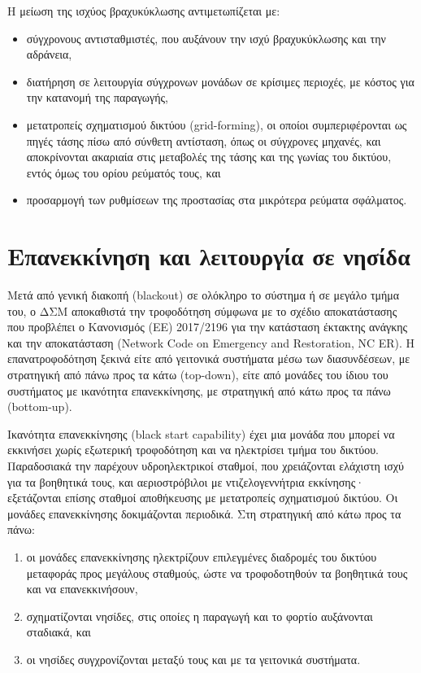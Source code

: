 Η μείωση της ισχύος βραχυκύκλωσης αντιμετωπίζεται με:

\begin{itemize}
\item σύγχρονους αντισταθμιστές, που αυξάνουν την ισχύ βραχυκύκλωσης και την αδράνεια,
\item διατήρηση σε λειτουργία σύγχρονων μονάδων σε κρίσιμες περιοχές, με κόστος για την
      κατανομή της παραγωγής,
\item μετατροπείς σχηματισμού δικτύου (grid-forming), οι οποίοι συμπεριφέρονται ως πηγές τάσης
      πίσω από σύνθετη αντίσταση, όπως οι σύγχρονες μηχανές, και αποκρίνονται ακαριαία στις
      μεταβολές της τάσης και της γωνίας του δικτύου, εντός όμως του ορίου ρεύματός τους, και
\item προσαρμογή των ρυθμίσεων της προστασίας στα μικρότερα ρεύματα σφάλματος.
\end{itemize}

\section{Επανεκκίνηση και λειτουργία σε νησίδα}
\label{sec:restoration}

Μετά από γενική διακοπή (blackout) σε ολόκληρο το σύστημα ή σε μεγάλο τμήμα του, ο ΔΣΜ
αποκαθιστά την τροφοδότηση σύμφωνα με το σχέδιο αποκατάστασης που προβλέπει ο Κανονισμός (ΕΕ)
2017/2196 για την κατάσταση έκτακτης ανάγκης και την αποκατάσταση (Network Code on Emergency and
Restoration, NC ER). Η επανατροφοδότηση ξεκινά είτε από γειτονικά συστήματα μέσω των
διασυνδέσεων, με στρατηγική από πάνω προς τα κάτω (top-down), είτε από μονάδες του ίδιου του
συστήματος με ικανότητα επανεκκίνησης, με στρατηγική από κάτω προς τα πάνω (bottom-up).

Ικανότητα επανεκκίνησης (black start capability) έχει μια μονάδα που μπορεί να εκκινήσει χωρίς
εξωτερική τροφοδότηση και να ηλεκτρίσει τμήμα του δικτύου. Παραδοσιακά την παρέχουν
υδροηλεκτρικοί σταθμοί, που χρειάζονται ελάχιστη ισχύ για τα βοηθητικά τους, και αεριοστρόβιλοι
με ντιζελογεννήτρια εκκίνησης· εξετάζονται επίσης σταθμοί αποθήκευσης με μετατροπείς
σχηματισμού δικτύου. Οι μονάδες επανεκκίνησης δοκιμάζονται περιοδικά. Στη στρατηγική από κάτω
προς τα πάνω:

\begin{enumerate}
\item οι μονάδες επανεκκίνησης ηλεκτρίζουν επιλεγμένες διαδρομές του δικτύου μεταφοράς προς
      μεγάλους σταθμούς, ώστε να τροφοδοτηθούν τα βοηθητικά τους και να επανεκκινήσουν,
\item σχηματίζονται νησίδες, στις οποίες η παραγωγή και το φορτίο αυξάνονται σταδιακά, και
\item οι νησίδες συγχρονίζονται μεταξύ τους και με τα γειτονικά συστήματα.
\end{enumerate}

